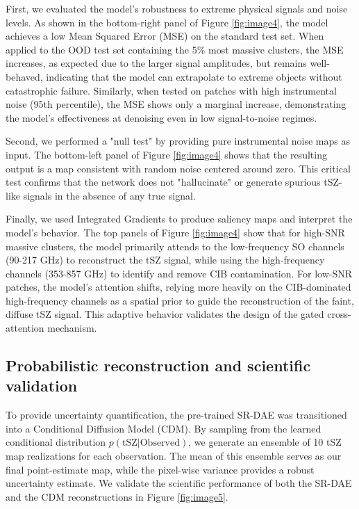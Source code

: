 \documentclass[]{article}
\begin{document}
First, we evaluated the model's robustness to extreme physical signals and noise levels. As shown in the bottom-right panel of Figure \ref{fig:image4}, the model achieves a low Mean Squared Error (MSE) on the standard test set. When applied to the OOD test set containing the 5\% most massive clusters, the MSE increases, as expected due to the larger signal amplitudes, but remains well-behaved, indicating that the model can extrapolate to extreme objects without catastrophic failure. Similarly, when tested on patches with high instrumental noise (95th percentile), the MSE shows only a marginal increase, demonstrating the model's effectiveness at denoising even in low signal-to-noise regimes.

Second, we performed a "null test" by providing pure instrumental noise maps as input. The bottom-left panel of Figure \ref{fig:image4} shows that the resulting output is a map consistent with random noise centered around zero. This critical test confirms that the network does not "hallucinate" or generate spurious tSZ-like signals in the absence of any true signal.

Finally, we used Integrated Gradients to produce saliency maps and interpret the model's behavior. The top panels of Figure \ref{fig:image4} show that for high-SNR massive clusters, the model primarily attends to the low-frequency SO channels (90-217 GHz) to reconstruct the tSZ signal, while using the high-frequency channels (353-857 GHz) to identify and remove CIB contamination. For low-SNR patches, the model's attention shifts, relying more heavily on the CIB-dominated high-frequency channels as a spatial prior to guide the reconstruction of the faint, diffuse tSZ signal. This adaptive behavior validates the design of the gated cross-attention mechanism.

\subsection{Probabilistic reconstruction and scientific validation}
To provide uncertainty quantification, the pre-trained SR-DAE was transitioned into a Conditional Diffusion Model (CDM). By sampling from the learned conditional distribution $p(\text{tSZ} | \text{Observed})$, we generate an ensemble of 10 tSZ map realizations for each observation. The mean of this ensemble serves as our final point-estimate map, while the pixel-wise variance provides a robust uncertainty estimate. We validate the scientific performance of both the SR-DAE and the CDM reconstructions in Figure \ref{fig:image5}.
\end{document}
